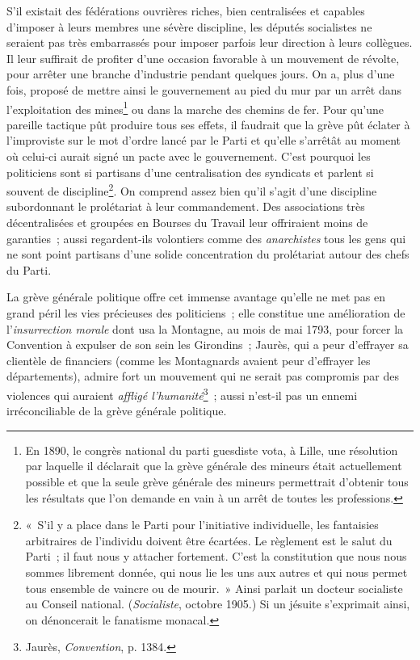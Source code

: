 \documentclass[french,twoside]{book} %
\begin{document}
S’il existait des fédérations ouvrières riches, bien centralisées et capables d’imposer à leurs membres une sévère discipline, les députés socialistes ne seraient pas très embarrassés pour imposer parfois leur direction à leurs collègues. Il leur suffirait de profiter d’une occasion favorable à un mouvement de révolte, pour arrêter une  branche d’industrie pendant quelques jours. On a, plus d’une fois, proposé de mettre ainsi le gouvernement au pied du mur par un arrêt dans l’exploitation des mines\footnote{ \noindent En 1890, le congrès national du parti guesdiste vota, à Lille, une résolution par laquelle il déclarait que la grève générale des mineurs était actuellement possible et que la seule grève générale des mineurs permettrait d’obtenir tous les résultats que l’on demande en vain à un arrêt de toutes les professions.
 } ou dans la marche des chemins de fer. Pour qu’une pareille tactique pût produire tous ses effets, il faudrait que la grève pût éclater à l’improviste sur le mot d’ordre lancé par le Parti et qu’elle s’arrêtât au moment où celui-ci aurait signé un pacte avec le gouvernement. C’est pourquoi les politiciens sont si partisans d’une centralisation des syndicats et parlent si souvent de discipline\footnote{ \noindent « S’il y a place dans le Parti pour l’initiative individuelle, les fantaisies arbitraires de l’individu doivent être écartées. Le règlement est le salut du Parti ; il faut nous y attacher fortement. C’est la constitution que nous nous sommes librement donnée, qui nous lie les uns aux autres et qui nous permet tous ensemble de vaincre ou de mourir. » Ainsi parlait un docteur socialiste au Conseil national. (\emph{Socialiste}, octobre 1905.) Si un jésuite s’exprimait ainsi, on dénoncerait le fanatisme monacal.
 }. On comprend assez bien qu’il s’agit d’une discipline subordonnant le prolétariat à leur commandement. Des associations très décentralisées et groupées en Bourses du Travail leur offriraient moins de garanties ; aussi regardent-ils volontiers comme des \emph{anarchistes} tous les gens qui ne sont point partisans d’une solide concentration du prolétariat autour des chefs du Parti.\par
 La grève générale politique offre cet immense avantage qu’elle ne met pas en grand péril les vies précieuses des politiciens ; elle constitue une amélioration de l’\emph{insurrection morale} dont usa la Montagne, au mois de mai 1793, pour forcer la Convention à expulser de son sein les Girondins ; Jaurès, qui a peur d’effrayer sa clientèle de financiers (comme les Montagnards avaient peur d’effrayer les départements), admire fort un mouvement qui ne serait pas compromis par des violences qui auraient \emph{affligé l’humanité}\footnote{ \noindent Jaurès, \emph{Convention}, p. 1384.
 } ; aussi n’est-il pas un ennemi irréconciliable de la grève générale politique.\par
\end{document}
